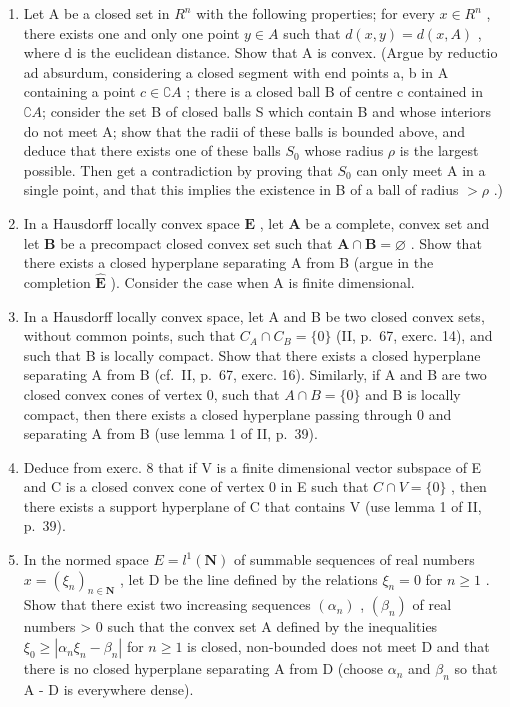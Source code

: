 \begin{enumerate}
\def\labelenumi{\arabic{enumi})}
\setcounter{enumi}{5}
\item
  Let A be a closed set in \(R^{n}\) with the following properties; for every \(x \in R^{n}\) , there exists one and only one point \(y \in A\) such that \(d(x, y) = d(x, A)\) , where d is the euclidean distance. Show that A is convex. (Argue by reductio ad absurdum, considering a closed segment with end points a, b in A containing a point \(c \in \complement A\) ; there is a closed ball B of centre c contained in \(\complement A\); consider the set B of closed balls S which contain B and whose interiors do not meet A; show that the radii of these balls is bounded above, and deduce that there exists one of these balls \(S_{0}\) whose radius \(\rho\) is the largest possible. Then get a contradiction by proving that \(S_{0}\) can only meet A in a single point, and that this implies the existence in B of a ball of radius \(> \rho\) .)
\item
  In a Hausdorff locally convex space \(\mathbf{E}\) , let \(\mathbf{A}\) be a complete, convex set and let \(\mathbf{B}\) be a precompact closed convex set such that \(\mathbf{A} \cap \mathbf{B} = \varnothing\) . Show that there exists a closed hyperplane separating A from B (argue in the completion \(\hat{\mathbf{E}}\) ). Consider the case when A is finite dimensional.
\item
  In a Hausdorff locally convex space, let A and B be two closed convex sets, without common points, such that \(C_{A} \cap C_{B} = \{0\}\) (II, p.~67, exerc. 14), and such that B is locally compact. Show that there exists a closed hyperplane separating A from B (cf.~II, p.~67, exerc. 16). Similarly, if A and B are two closed convex cones of vertex 0, such that \(A \cap B = \{0\}\) and B is locally compact, then there exists a closed hyperplane passing through 0 and separating A from B (use lemma 1 of II, p.~39).
\item
  Deduce from exerc. 8 that if V is a finite dimensional vector subspace of E and C is a closed convex cone of vertex 0 in E such that \(C \cap V = \{0\}\) , then there exists a support hyperplane of C that contains V (use lemma 1 of II, p.~39).
\item
  In the normed space \(E = l^{1}(\mathbf{N})\) of summable sequences of real numbers \(x = (\xi_{n})_{n \in \mathbf{N}}\) , let D be the line defined by the relations \(\xi_{n} = 0\) for \(n \geqslant 1\) . Show that there exist two increasing sequences \((\alpha_{n})\) , \((\beta_{n})\) of real numbers > 0 such that the convex set A defined by the inequalities \(\xi_{0} \geqslant |\alpha_{n}\xi_{n} - \beta_{n}|\) for \(n \geqslant 1\) is closed, non-bounded does not meet D and that there is no closed hyperplane separating A from D (choose \(\alpha_{n}\) and \(\beta_{n}\) so that A - D is everywhere dense).
\end{enumerate}

